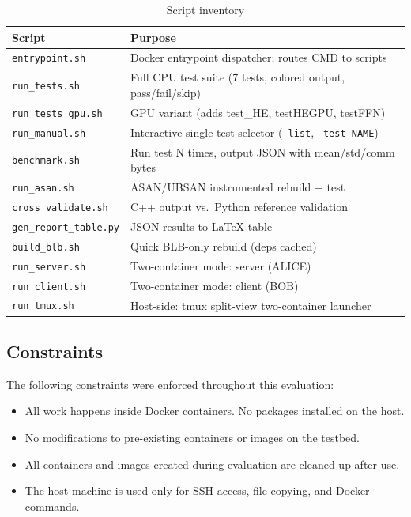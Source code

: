 \begin{table}[h]
\centering
\caption{Script inventory}
\label{tab:scripts}
\begin{tabular}{lp{9cm}}
\toprule
Script & Purpose \\
\midrule
\texttt{entrypoint.sh} & Docker entrypoint dispatcher; routes CMD to scripts \\
\texttt{run\_tests.sh} & Full CPU test suite (7 tests, colored output, pass/fail/skip) \\
\texttt{run\_tests\_gpu.sh} & GPU variant (adds test\_HE, testHEGPU, testFFN) \\
\texttt{run\_manual.sh} & Interactive single-test selector (\texttt{--list}, \texttt{--test NAME}) \\
\texttt{benchmark.sh} & Run test N times, output JSON with mean/std/comm bytes \\
\texttt{run\_asan.sh} & ASAN/UBSAN instrumented rebuild + test \\
\texttt{cross\_validate.sh} & C++ output vs.\ Python reference validation \\
\texttt{gen\_report\_table.py} & JSON results to \LaTeX{} table \\
\texttt{build\_blb.sh} & Quick BLB-only rebuild (deps cached) \\
\texttt{run\_server.sh} & Two-container mode: server (ALICE) \\
\texttt{run\_client.sh} & Two-container mode: client (BOB) \\
\texttt{run\_tmux.sh} & Host-side: tmux split-view two-container launcher \\
\bottomrule
\end{tabular}
\end{table}

\subsection{Constraints}

The following constraints were enforced throughout this evaluation:
\begin{itemize}[nosep]
  \item All work happens inside Docker containers. No packages installed on the host.
  \item No modifications to pre-existing containers or images on the testbed.
  \item All containers and images created during evaluation are cleaned up after use.
  \item The host machine is used only for SSH access, file copying, and Docker commands.
\end{itemize}
